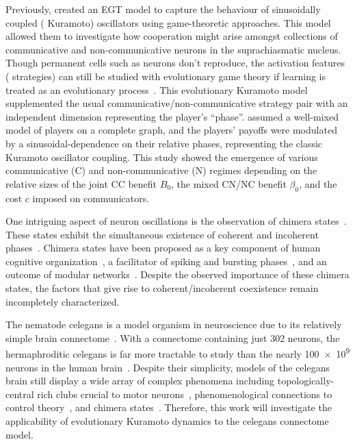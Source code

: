 \documentclass[pdflatex,lineno,referee,sn-mathphys-ay]{sn-jnl}
\begin{document}
Previously, \citet{tripp2022evolutionary} created an EGT model
to capture the behaviour of sinusoidally coupled (\ie{} Kuramoto) oscillators
using game-theoretic approaches.
This model allowed them to investigate how cooperation might arise
amongst collections of communicative and non-communicative neurons
in the suprachiasmatic nucleus.
Though permanent cells such as neurons don't reproduce,
the activation features (\ie{} strategies) can still
be studied with evolutionary game theory
if learning is treated as
an evolutionary process~\citep{cohen2009evolutionary}.
This evolutionary Kuramoto model
supplemented the usual communicative/non-communicative
strategy pair with an independent dimension representing the player's ``phase''.
 assumed a well-mixed model of players
on a complete graph, and the players' payoffs were modulated
by a sinusoidal-dependence on their relative phases,
representing the classic Kuramoto oscillator coupling.
This study showed the emergence of various communicative (C)
and non-communicative (N) regimes depending on the relative sizes
of the joint CC benefit $B_0$, the mixed CN/NC benefit $\beta_0$,
and the cost $c$ imposed on communicators.

One intriguing aspect of neuron oscillations
is the observation of chimera states~\citep
[\eg{}][and references therein]{majhi2019chimera}.
These states exhibit the simultaneous existence
of coherent and incoherent phases~\citep{abrams2004chimera}.
Chimera states have been proposed
as a key component of human cognitive organization~\citep{bansal2019cognitive},
a facilitator of spiking and bursting phases~\citep{santos2017chimera},
and an outcome of modular networks~\citep{hizanidis2016chimera}.
Despite the observed importance of these chimera states,
the factors that give rise to coherent/incoherent coexistence
remain incompletely characterized.

The nematode \gls{celegans}
is a model organism in neuroscience due to
its relatively simple brain connectome~\citep{cook2019whole}.
With a connectome containing just \num{302} neurons,
the hermaphroditic \gls{celegans} is far more tractable to study
than the nearly \num{100e9} neurons
in the human brain~\citep[\eg][]{von2016search}.
Despite their simplicity, models of the \gls{celegans} brain
still display a wide array of complex phenomena including
topologically-central rich clubs
crucial to motor neurons~\citep{towlson2013rich},
phenomenological connections to control theory~\citep{yan2017network},
and chimera states~\citep{hizanidis2016chimera}.
Therefore, this work will investigate the applicability
of evolutionary Kuramoto dynamics to the \gls{celegans}
connectome model.
\end{document}
